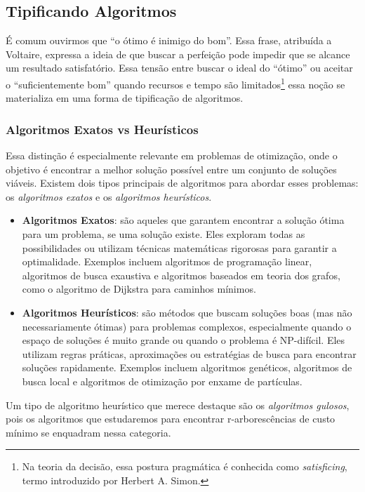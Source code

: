 \subsection{Tipificando Algoritmos}

É comum ouvirmos que “o ótimo é inimigo do bom”. Essa frase, atribuída a Voltaire, expressa a ideia de que buscar a perfeição pode impedir que se alcance um resultado satisfatório. Essa tensão entre buscar o ideal do “ótimo”  ou aceitar o “suficientemente bom” quando recursos e tempo são limitados\footnote{Na teoria da decisão, essa postura pragmática é conhecida como \emph{satisficing}, termo introduzido por Herbert A. Simon.} essa noção se materializa em uma forma de tipificação de algoritmos.

\subsubsection{Algoritmos Exatos vs Heurísticos}


Essa distinção é especialmente relevante em problemas de otimização, onde o objetivo é encontrar a melhor solução possível entre um conjunto de soluções viáveis. Existem dois tipos principais de algoritmos para abordar esses problemas: os \emph{algoritmos exatos} e os \emph{algoritmos heurísticos}.

\begin{itemize}\setlength{\itemsep}{2pt}
	\item \textbf{Algoritmos Exatos}: são aqueles que garantem encontrar a solução ótima para um problema, se uma solução existe. Eles exploram todas as possibilidades ou utilizam técnicas matemáticas rigorosas para garantir a optimalidade. Exemplos incluem algoritmos de programação linear, algoritmos de busca exaustiva e algoritmos baseados em teoria dos grafos, como o algoritmo de Dijkstra para caminhos mínimos.
	\item \textbf{Algoritmos Heurísticos}: são métodos que buscam soluções boas (mas não necessariamente ótimas) para problemas complexos, especialmente quando o espaço de soluções é muito grande ou quando o problema é NP-difícil. Eles utilizam regras práticas, aproximações ou estratégias de busca para encontrar soluções rapidamente. Exemplos incluem algoritmos genéticos, algoritmos de busca local e algoritmos de otimização por enxame de partículas.
\end{itemize}


Um tipo de algoritmo heurístico que merece destaque são os \emph{algoritmos gulosos}, pois os algoritmos que estudaremos para encontrar r-arborescências de custo mínimo se enquadram nessa categoria.

